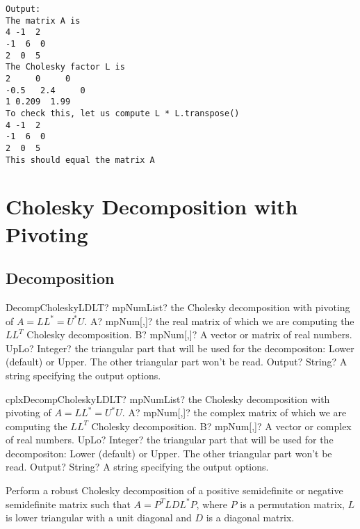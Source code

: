 \begin{verbatim}
Output:
The matrix A is
4 -1  2
-1  6  0
2  0  5
The Cholesky factor L is
2     0     0
-0.5   2.4     0
1 0.209  1.99
To check this, let us compute L * L.transpose()
4 -1  2
-1  6  0
2  0  5
This should equal the matrix A
\end{verbatim}



\newpage
\section{Cholesky Decomposition with Pivoting}
\label{Cholesky Decomposition with Pivoting}

\subsection{Decomposition}

\begin{mpFunctionsExtract}
	\mpFunctionFour
	{DecompCholeskyLDLT? mpNumList? the Cholesky decomposition with pivoting of $A = LL^* = U^*U$.}
	{A? mpNum[,]? the real matrix of which we are computing the $LL^T$ Cholesky decomposition.}
	{B? mpNum[,]? A vector or matrix of real numbers.}
	{UpLo? Integer? the triangular part that will be used for the decompositon: Lower (default) or Upper. The other triangular part won't be read.}
	{Output? String? A string specifying the output options.}
\end{mpFunctionsExtract}

\vspace{0.6cm}
\begin{mpFunctionsExtract}
	\mpFunctionFour
	{cplxDecompCholeskyLDLT? mpNumList? the Cholesky decomposition with pivoting of $A = LL^* = U^*U$.}
	{A? mpNum[,]? the complex matrix of which we are computing the $LL^T$ Cholesky decomposition.}
	{B? mpNum[,]? A vector or complex of real numbers.}
	{UpLo? Integer? the triangular part that will be used for the decompositon: Lower (default) or Upper. The other triangular part won't be read.}
	{Output? String? A string specifying the output options.}
\end{mpFunctionsExtract}


\vspace{0.3cm}
Perform a robust Cholesky decomposition of a positive semidefinite or negative semidefinite matrix  such that $A=P^T LDL^{*} P$, where $P$ is a permutation matrix, $L$ is lower triangular with a unit diagonal and $D$ is a diagonal matrix.

